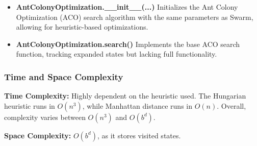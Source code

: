 \begin{itemize}
    \item \textbf{AntColonyOptimization.\_\_init\_\_(...)}
          Initializes the Ant Colony Optimization (ACO) search algorithm with the same parameters as Swarm, allowing for heuristic-based optimizations.

    \item \textbf{AntColonyOptimization.search()}
          Implements the base ACO search function, tracking expanded states but lacking full functionality.
\end{itemize}

\subsubsection{Time and Space Complexity}
\textbf{Time Complexity:} Highly dependent on the heuristic used. The Hungarian heuristic runs in \( O(n^3) \), while Manhattan distance runs in \( O(n) \). Overall, complexity varies between \( O(n^3) \) and \( O(b^d) \).

\textbf{Space Complexity:} \( O(b^d) \), as it stores visited states.
